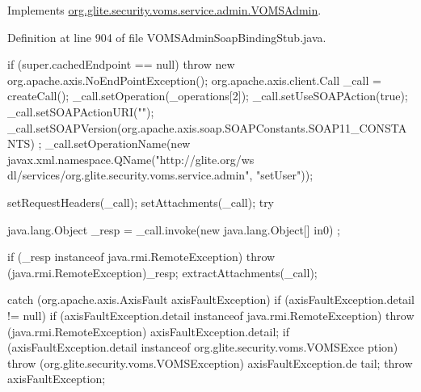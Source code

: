 Implements \hyperlink{interfaceorg_1_1glite_1_1security_1_1voms_1_1service_1_1admin_1_1VOMSAdmin_a452eb7b4ee3bcf8c3f7f155b1e772321}{org.glite.security.voms.service.admin.VOMSAdmin}.



Definition at line 904 of file VOMSAdminSoapBindingStub.java.


\begin{DoxyCode}
                                                                                 
                                                      {
        if (super.cachedEndpoint == null) {
            throw new org.apache.axis.NoEndPointException();
        }
        org.apache.axis.client.Call _call = createCall();
        _call.setOperation(_operations[2]);
        _call.setUseSOAPAction(true);
        _call.setSOAPActionURI("");
        _call.setSOAPVersion(org.apache.axis.soap.SOAPConstants.SOAP11_CONSTANTS)
      ;
        _call.setOperationName(new javax.xml.namespace.QName("http://glite.org/ws
      dl/services/org.glite.security.voms.service.admin", "setUser"));

        setRequestHeaders(_call);
        setAttachments(_call);
 try {        java.lang.Object _resp = _call.invoke(new java.lang.Object[] {in0})
      ;

        if (_resp instanceof java.rmi.RemoteException) {
            throw (java.rmi.RemoteException)_resp;
        }
        extractAttachments(_call);
  } catch (org.apache.axis.AxisFault axisFaultException) {
    if (axisFaultException.detail != null) {
        if (axisFaultException.detail instanceof java.rmi.RemoteException) {
              throw (java.rmi.RemoteException) axisFaultException.detail;
         }
        if (axisFaultException.detail instanceof org.glite.security.voms.VOMSExce
      ption) {
              throw (org.glite.security.voms.VOMSException) axisFaultException.de
      tail;
         }
   }
  throw axisFaultException;
}
    }
\end{DoxyCode}



